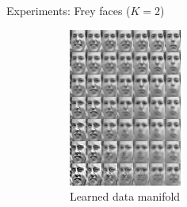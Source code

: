 \documentclass[unicode,11pt]{beamer}
\begin{document}
\begin{frame}[fragile]{Experiments: Frey faces ($K = 2$)}
  \begin{figure}
    \centering
    \begin{subfigure}[b]{.4\linewidth}
      \centering
      \includegraphics[width=.8\linewidth]{images/nf_frey_B400_E8000_N560_L2_H200_F2_C_manifold_8}
      \caption{Learned data manifold}
    \end{subfigure}
    \hspace{1em}
    \begin{subfigure}[b]{.4\linewidth}
      \centering

\end{subfigure}
\end{figure}
\end{frame}
\end{document}
